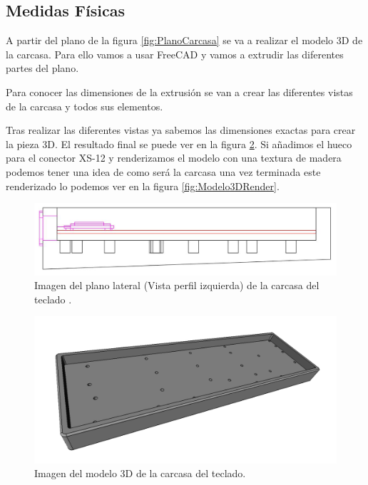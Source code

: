 \subsection{Medidas Físicas}
A partir del plano de la figura \ref{fig:PlanoCarcasa} se va a realizar el modelo 3D de la carcasa. Para ello vamos a usar FreeCAD y vamos a extrudir las diferentes partes del plano.

Para conocer las dimensiones de la extrusión se van a crear las diferentes vistas de la carcasa y todos sus elementos.

Tras realizar las diferentes vistas ya sabemos las dimensiones exactas para crear la pieza 3D. El resultado final se puede ver en la figura \ref{fig:Modelo3D}. Si añadimos el hueco para el conector XS-12 y renderizamos el modelo con una textura de madera podemos tener una idea de como será la carcasa una vez terminada este renderizado lo podemos ver en la figura \ref{fig:Modelo3DRender}.

\begin{figure}[H]
    \centering
    \includegraphics[width=1\textwidth]{imagenes/Capitulos/Cap06/PlanoCarcasaVistaLateral.png}
    \caption{Imagen del plano lateral (Vista perfil izquierda) de la carcasa del teclado \cite{Repo:Planos}.}
    \label{fig:PlanoCarcasaVistaLateral}
\end{figure}

\begin{figure}[H]
    \centering
    \includegraphics[width=1\textwidth]{imagenes/Capitulos/Cap06/Modelo3D.png}
    \caption{Imagen del modelo 3D de la carcasa del teclado.}
    \label{fig:Modelo3D}
\end{figure}

